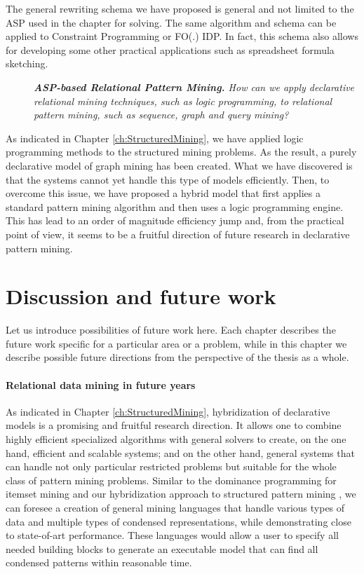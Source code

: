 The general rewriting schema we have proposed is general and not
limited to the ASP used in the chapter for solving. The same algorithm
    and schema can be applied to Constraint Programming or FO(.) IDP.
    In fact, this schema also allows for developing some other practical
    applications such as spreadsheet formula sketching.


\begin{description}
    \item[\cfour]  \textit{ \textbf{ASP-based Relational Pattern Mining.}
    How can we apply declarative relational mining techniques, such as
        logic programming, to relational pattern mining, such as sequence, graph and query mining?
}
\end{description}

As indicated in Chapter \ref{ch:StructuredMining}, we have applied 
logic programming methods to the structured mining problems. As the
result, 
a purely declarative model of graph mining has been created. What we
have discovered is that the systems cannot yet handle this type of
models efficiently. Then, to overcome this issue, we have proposed a hybrid model that
first applies a standard pattern mining algorithm and then uses a
logic programming engine. This has lead to an order of magnitude
efficiency jump and, from the practical point of view, it seems to be
a fruitful direction of future research in declarative pattern
mining.

\section{Discussion and future work}
Let us introduce possibilities of future work here. Each chapter
describes the future work specific for a particular area or a problem,
while in this chapter we describe possible future directions from the
perspective of the thesis as a whole.


\paragraph{Relational data mining in future years}
As indicated in Chapter \ref{ch:StructuredMining}, hybridization of
declarative models is a promising and fruitful research direction. It
allows one to combine highly efficient specialized algorithms with
general solvers to create, on the one hand, efficient and scalable
systems; and on the other hand, general systems that can handle not
only particular restricted problems but suitable for the whole class of pattern
mining problems. Similar to the dominance programming for itemset
mining \parencite{dominanceprogramming} and our hybridization approach
to structured pattern mining \parencite{ruleml_hybrid}, we can foresee
a creation of 
general mining languages that handle various types of data and
multiple types of condensed representations, while demonstrating close to
state-of-art performance. These languages would allow a user to
specify all needed building blocks to generate an executable model
that can find all condensed patterns within reasonable time.

